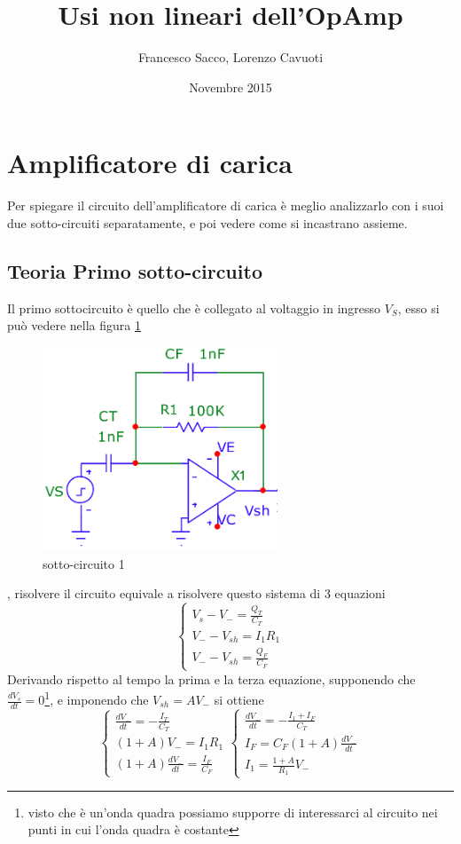 \documentclass{article}
\date{Novembre 2015}
\author{Francesco Sacco, Lorenzo Cavuoti}
\title{Usi non lineari dell'OpAmp}
\begin{document}
	\maketitle
	\section{Amplificatore di carica}
		Per spiegare il circuito dell'amplificatore di carica è meglio analizzarlo con i suoi due sotto-circuiti separatamente, e poi vedere come si incastrano assieme.\newline
		\subsection{Teoria Primo sotto-circuito}
			Il primo sottocircuito è quello che è collegato al voltaggio in ingresso $V_S$, esso si può vedere nella figura \ref{fig:circ1}
			\begin{figure}
				\label{fig:circ1}
				\centering
				\includegraphics[width=70mm]{immagini/circ1b.png}
				\caption{sotto-circuito 1}
			\end{figure}
			, risolvere il circuito equivale a risolvere questo sistema di 3 equazioni
			\begin{equation}
				\begin{cases}
					V_s-V_-=\frac{Q_T}{C_T}\\
					V_--V_{sh}=I_1R_1\\
					V_--V_{sh}=\frac{Q_F}{C_F}
				\end{cases}
			\end{equation}
			Derivando rispetto al tempo la prima e la terza equazione, supponendo che $\frac{dV_s}{dt}=0$\footnote{visto che è un'onda quadra possiamo supporre di interessarci al circuito nei punti in cui l'onda quadra è costante}, e imponendo che $V_{sh}=AV_-$ si ottiene
			\[
				\begin{cases}
					\frac{dV_-}{dt}=-\frac{I_T}{C_T}\\
					(1+A)V_-=I_1R_1\\
					(1+A)\frac{dV_-}{dt}=\frac{I_F}{C_F}
				\end{cases}
				\begin{cases}
					\frac{dV_-}{dt}=-\frac{I_1+I_F}{C_T}\\
					I_F=C_F(1+A)\frac{dV_-}{dt}\\
					I_1=\frac{1+A}{R_1}V_-
				\end{cases}
			\]
\end{document}

